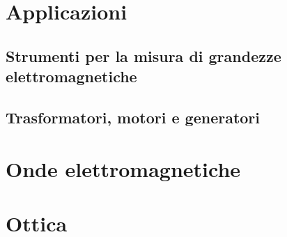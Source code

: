 \chapter{Applicazioni}
\section{Strumenti per la misura di grandezze elettromagnetiche}

\section{Trasformatori, motori e generatori}

\chapter{Onde elettromagnetiche}

\chapter{Ottica}
